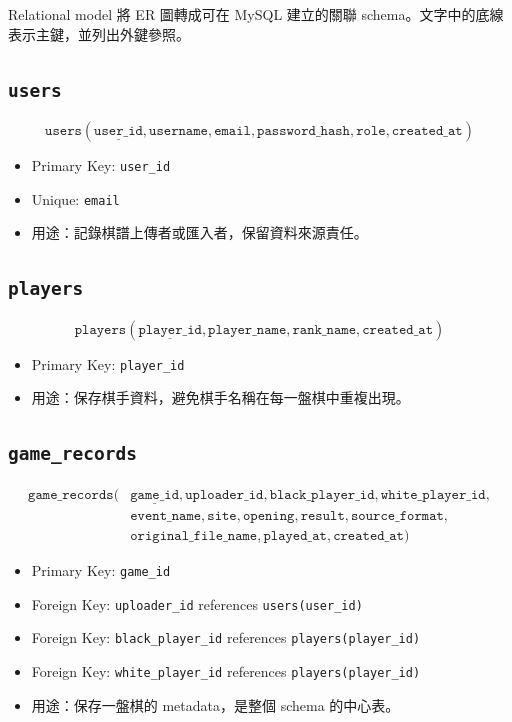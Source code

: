\documentclass[12pt,a4paper,fontset=none]{ctexart}
\begin{document}
Relational model 將 ER 圖轉成可在 MySQL 建立的關聯 schema。文字中的底線表示主鍵，並列出外鍵參照。

\subsection{\texttt{users}}

\[
\texttt{users}(
\underline{\texttt{user\_id}},
\texttt{username},
\texttt{email},
\texttt{password\_hash},
\texttt{role},
\texttt{created\_at}
)
\]

\begin{itemize}
  \item Primary Key: \texttt{user\_id}
  \item Unique: \texttt{email}
  \item 用途：記錄棋譜上傳者或匯入者，保留資料來源責任。
\end{itemize}

\subsection{\texttt{players}}

\[
\texttt{players}(
\underline{\texttt{player\_id}},
\texttt{player\_name},
\texttt{rank\_name},
\texttt{created\_at}
)
\]

\begin{itemize}
  \item Primary Key: \texttt{player\_id}
  \item 用途：保存棋手資料，避免棋手名稱在每一盤棋中重複出現。
\end{itemize}

\subsection{\texttt{game\_records}}

\[
\begin{aligned}
\texttt{game\_records}(
&\underline{\texttt{game\_id}},
\texttt{uploader\_id},
\texttt{black\_player\_id},
\texttt{white\_player\_id},\\
&\texttt{event\_name},
\texttt{site},
\texttt{opening},
\texttt{result},
\texttt{source\_format},\\
&\texttt{original\_file\_name},
\texttt{played\_at},
\texttt{created\_at})
\end{aligned}
\]

\begin{itemize}
  \item Primary Key: \texttt{game\_id}
  \item Foreign Key: \texttt{uploader\_id} references \texttt{users(user\_id)}
  \item Foreign Key: \texttt{black\_player\_id} references \texttt{players(player\_id)}
  \item Foreign Key: \texttt{white\_player\_id} references \texttt{players(player\_id)}
  \item 用途：保存一盤棋的 metadata，是整個 schema 的中心表。
\end{itemize}
\end{document}
